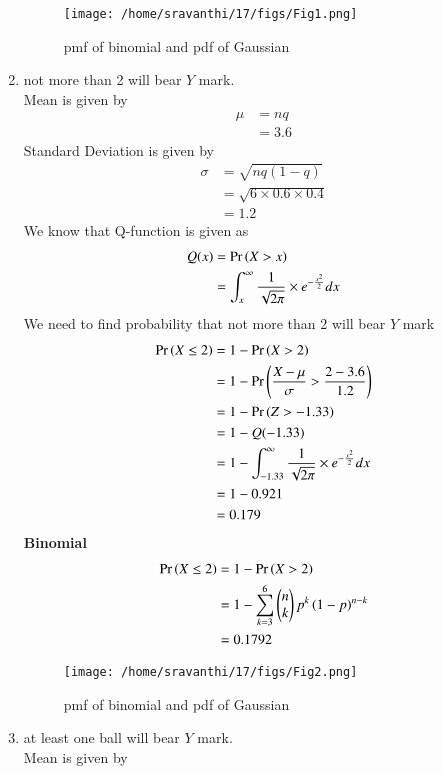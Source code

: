 \documentclass[journal,12pt,twocolumn]{IEEEtran}
\theoremstyle{remark}
\begin{document}
\begin{enumerate}
\begin{figure}
\texttt{[image: /home/sravanthi/17/figs/Fig1.png]}
\caption{pmf of binomial and pdf of Gaussian }
\label{fig:gaussian/9/3/17/}
\end{figure}
\item not more than 2 will bear $Y$ mark.\\
Mean is given by
\begin{align}
	\mu &= nq \\
	&= 3.6
\end{align}
Standard Deviation is given by
\begin{align}
	\sigma &= \sqrt{nq(1 - q)}\\
	&= \sqrt{6 \times 0.6 \times 0.4}\\
	&=  1.2
\end{align}
We know that Q-function is given as\\
\begin{align}
Q(x) &= \Pr\left(X > x\right)\\
&= \int_{x}^{\infty}\frac{1}{\sqrt{2\pi}}\times e^{-\frac{x^2}{2}}dx
\end{align}
We need to find probability that not more than 2 will bear $Y$ mark
\begin{align}
\Pr\left(X \leq 2\right) &= 1 - \Pr\left(X > 2\right)\\
&= 1 - \Pr\left(\frac{X - \mu}{\sigma} > \frac{2 - 3.6}{1.2}\right) \\
&= 1 - \Pr\left(Z > -1.33\right) \\
&= 1 - Q(-1.33)\\
&= 1 - \int_{-1.33}^{\infty}\frac{1}{\sqrt{2\pi}}\times e^{-\frac{x^2}{2}}dx\\
&= 1- 0.921\\
&=0.179
\end{align}
\textbf{Binomial}
\begin{align}
\Pr\left(X\leq 2\right) &= 1 - \Pr\left(X>2\right) \\
&= 1-\sum_{k=3}^{6}\begin{pmatrix}n\\k\end{pmatrix}p^k\left(1-p\right)^{n-k} \\
&= 0.1792
\end{align}
\begin{figure}
\texttt{[image: /home/sravanthi/17/figs/Fig2.png]}
\caption{pmf of binomial and pdf of Gaussian }
\label{fig:gaussian/9/3/17/}
\end{figure}
\item at least one ball will bear $Y$ mark.\\
Mean is given by
\begin{align}

\end{align}
\end{enumerate}
\end{document}
